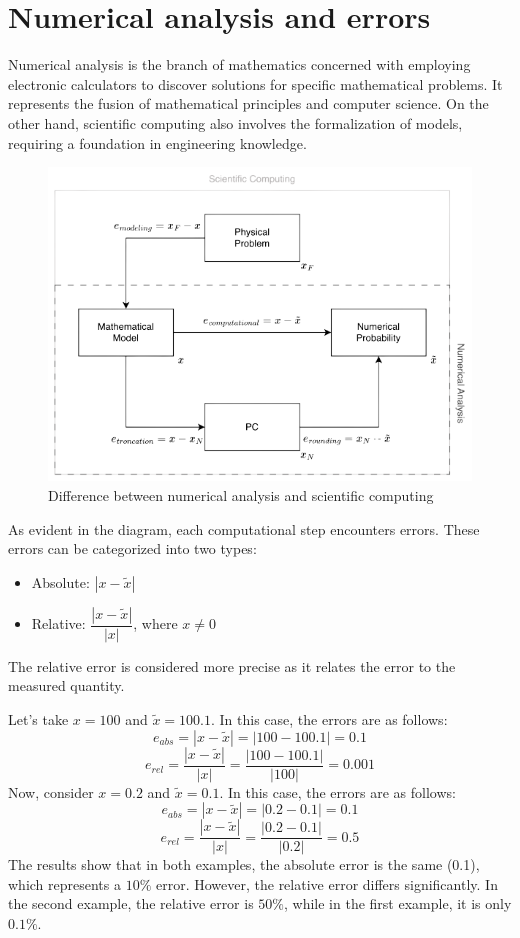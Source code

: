 \section{Numerical analysis and errors}

Numerical analysis is the branch of mathematics concerned with employing electronic calculators to discover solutions for specific mathematical problems. 
It represents the fusion of mathematical principles and computer science.
On the other hand, scientific computing also involves the formalization of models, requiring a foundation in engineering knowledge.
\begin{figure}[H]
    \centering
    \includegraphics[width=0.75\linewidth]{images/difference.png}
    \caption{Difference between numerical analysis and scientific computing}
\end{figure}
As evident in the diagram, each computational step encounters errors. These errors can be categorized into two types:
\begin{itemize}
    \item Absolute: $\left\lvert x - \tilde{x} \right\rvert$
    \item Relative: $\dfrac{\left\lvert x - \tilde{x} \right\rvert}{\left\lvert x \right\rvert}$, where $x \neq 0$
\end{itemize}
The relative error is considered more precise as it relates the error to the measured quantity.
\begin{example}
    Let's take $x=100$ and $\tilde{x}=100.1$. 
    In this case, the errors are as follows:
    \[e_{abs}=\left\lvert x - \tilde{x} \right\rvert=\left\lvert 100 - 100.1 \right\rvert=0.1\]
    \[e_{rel}=\dfrac{\left\lvert x - \tilde{x} \right\rvert}{\left\lvert x \right\rvert}=\dfrac{\left\lvert 100 - 100.1 \right\rvert}{\left\lvert 100 \right\rvert}=0.001\]
    Now, consider $x=0.2$ and $\tilde{x}=0.1$. 
    In this case, the errors are as follows:
    \[e_{abs}=\left\lvert x - \tilde{x} \right\rvert=\left\lvert 0.2 - 0.1 \right\rvert=0.1\]
    \[e_{rel}=\dfrac{\left\lvert x - \tilde{x} \right\rvert}{\left\lvert x \right\rvert}=\dfrac{\left\lvert 0.2 - 0.1 \right\rvert}{\left\lvert 0.2 \right\rvert}=0.5\]
    The results show that in both examples, the absolute error is the same (0.1), which represents a $10\%$ error. 
    However, the relative error differs significantly.
    In the second example, the relative error is $50\%$, while in the first example, it is only $0.1\%$. 
\end{example}